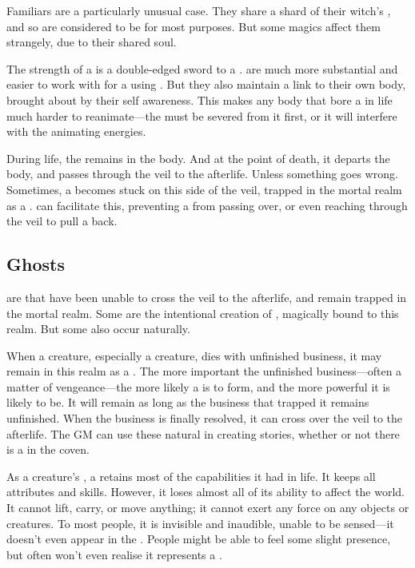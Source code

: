 Familiars are a particularly unusual case.
They share a shard of their witch's {\soul}, and so are considered to be {\strongsouled} for most purposes.
But some magics affect them strangely, due to their shared soul.

The strength of a {\soul} is a double-edged sword to a .
\capital{\strongsouls} are much more substantial and easier to work with for a  using {\ghosts}.
But they also maintain a link to their own body, brought about by their self awareness.
This makes any body that bore a {\strongsoul} in life much harder to reanimate---the {\soul} must be severed from it first, or it will interfere with the animating energies.

During life, the {\soul} remains in the body.
And at the point of death, it departs the body, and passes through the veil to the afterlife.
Unless something goes wrong.
Sometimes, a {\soul} becomes stuck on this side of the veil, trapped in the mortal realm as a {\ghost}.
 can facilitate this, preventing a {\soul} from passing over, or even reaching through the veil to pull a {\soul} back.

\subsection{Ghosts}

\capital{\ghosts} are {\souls} that have been unable to cross the veil to the afterlife, and remain trapped in the mortal realm.
Some are the intentional creation of , magically bound to this realm.
But some also occur naturally.

When a creature, especially a {\strongsouled} creature, dies with unfinished business, it may remain in this realm as a {\ghost}.
The more important the unfinished business---often a matter of vengeance---the more likely a {\ghost} is to form, and the more powerful it is likely to be.
It will remain as long as the business that trapped it remains unfinished.
When the business is finally resolved, it can cross over the veil to the afterlife.
The GM can use these natural {\ghosts} in creating stories, whether or not there is a  in the coven.

As a creature's {\soul}, a {\ghost} retains most of the capabilities it had in life.
It keeps all attributes and skills.
However, it loses almost all of its ability to affect the world.
It cannot lift, carry, or move anything; it cannot exert any force on any objects or creatures.
To most people, it is invisible and inaudible, unable to be sensed---it doesn't even appear in the {\mentalrealm}.
People might be able to feel some slight presence, but often won't even realise it represents a {\ghost}.

